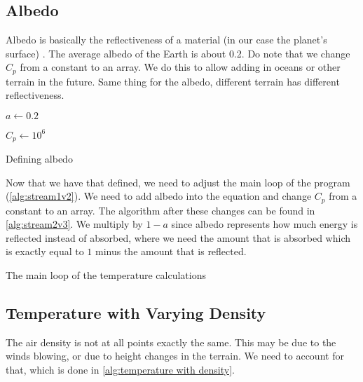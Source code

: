 \subsection{Albedo}
Albedo is basically the reflectiveness of a material (in our case the planet's surface) \cite{albedo}. The average albedo of the Earth is about 0.2. Do note that we change $C_p$ from a constant 
to an array. We do this to allow adding in oceans or other terrain in the future. Same thing for the albedo, different terrain has different reflectiveness.

\begin{algorithm}[hbt]
    $a \leftarrow 0.2$ \;

    $C_p \leftarrow 10^6$ \;
    \caption{Defining albedo}
    \label{alg:albedo}
\end{algorithm}

Now that we have that defined, we need to adjust the main loop of the program (\autoref{alg:stream1v2}). We need to add albedo into the
equation and change $C_p$ from a constant to an array. The algorithm after these changes can be found in \autoref{alg:stream2v3}. We multiply by $1 - a$ since albedo represents how much energy is 
reflected instead of absorbed, where we need the amount that is absorbed which is exactly equal to $1$ minus the amount that is reflected.

\begin{algorithm}[hbt]
    \SetAlgoLined
    \caption{The main loop of the temperature calculations}
    \label{alg:stream2v3}
\end{algorithm}

\subsection{Temperature with Varying Density}
The air density is not at all points exactly the same. This may be due to the winds blowing, or due to height changes in the terrain. We need to account for that, which is done in 
\autoref{alg:temperature with density}.

